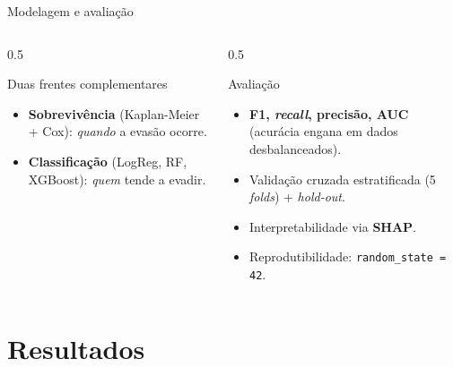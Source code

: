 \documentclass[aspectratio=169,11pt,brazil]{beamer}
\begin{document}
\begin{frame}{Modelagem e avaliação}
  \begin{columns}[T]
    \begin{column}{0.5\textwidth}
      \begin{block}{Duas frentes complementares}
        \begin{itemize}
          \item \textbf{Sobrevivência} (Kaplan-Meier + Cox): \emph{quando} a evasão ocorre.
          \item \textbf{Classificação} (LogReg, RF, XGBoost): \emph{quem} tende a evadir.
        \end{itemize}
      \end{block}
    \end{column}
    \begin{column}{0.5\textwidth}
      \begin{block}{Avaliação}
        \begin{itemize}
          \item \textbf{F1, \emph{recall}, precisão, AUC} (acurácia engana em dados desbalanceados).
          \item Validação cruzada estratificada (5 \emph{folds}) + \emph{hold-out}.
          \item Interpretabilidade via \textbf{SHAP}.
          \item Reprodutibilidade: \texttt{random\_state = 42}.
        \end{itemize}
      \end{block}
    \end{column}
  \end{columns}
\end{frame}

\section{Resultados}
\end{document}
